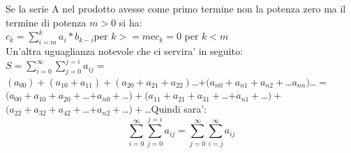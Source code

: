 \documentclass[12pt,a4paper]{article}
\begin{document}
\begin{flushleft}
\begin{itemize}
{\vspace{5mm}
Se la serie A nel prodotto avesse come primo termine non la potenza zero ma il termine di potenza $m>0$ si ha:\\
$c_k=\sum_{i=m}^{k} a_i * b_{k-i}$\hspace{5mm}per $k>=m$\hspace{5mm}e\hspace{5mm}$c_k=0$ per $k<m$\\
\vspace{5mm}
Un'altra uguaglianza notevole che ci servira' in seguito:\\
\vspace{5mm}
$S=\sum_{i=0}^{\infty}{\sum_{j=0}^{j=i}{a_{ij}}}=$\\
\vspace{5mm}
$(a_{00})+(a_{10}+a_{11})+(a_{20}+a_{21}+a_{22})$\dots$+(a_{n0}+a_{n1}+a_{n2}+$\dots$a_{nn})$\dots$=$\\
\vspace{5mm}
$(a_{00}+a_{10}+a_{20}+$\dots$+a_{n0}+$\dots$)+(a_{11}+a_{21}+a_{31}+$\dots$+a_{n1}+$\dots$)+$\\
\vspace{5mm}
$(a_{22}+a_{32}+a_{42}+$\dots$+a_{n2}+$\dots$)+$\dots\hspace{5mm}Quindi sara':\\
\vspace{5mm}
\begin{equation}
\label{eq:ind6}
\sum_{i=0}^{\infty}{\sum_{j=0}^{j=i}{a_{ij}}}=\sum_{j=0}^{\infty}{\sum_{i=j}^{\infty}{a_{ij}}}
\end{equation}
}


\end{itemize}
\end{flushleft}
\end{document}
